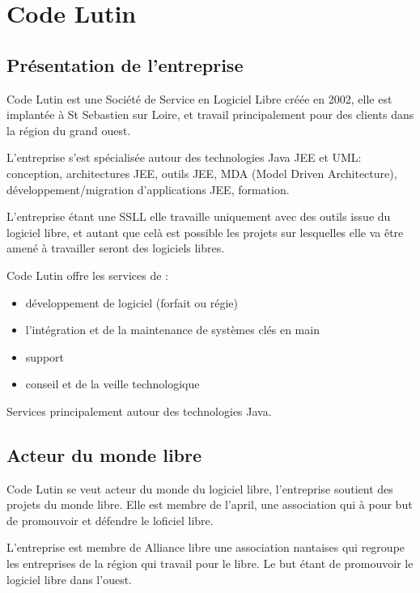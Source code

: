 \section{Code Lutin}

\subsection{Présentation de l'entreprise}


Code Lutin est une Société de Service en Logiciel Libre créée en 2002, elle est
implantée à St Sebastien sur Loire, et travail principalement pour des clients
dans la région du grand ouest.

L'entreprise s'est spécialisée autour des technologies Java JEE et UML:
conception, architectures JEE, outils JEE, MDA (Model Driven Architecture), 
développement/migration d’applications JEE, formation.

L'entreprise étant une SSLL elle travaille uniquement avec des outils issue du
logiciel libre, et autant que celà est possible les projets sur lesquelles elle
va être amené à travailler seront des logiciels libres.

Code Lutin offre les services de : 
\begin{itemize}
\item développement de logiciel (forfait ou régie)
\item l’intégration et de la maintenance de systèmes clés en main
\item support
\item conseil et de la veille technologique
\end{itemize}

Services principalement autour des technologies Java.


\subsection{Acteur du monde libre}

Code Lutin se veut acteur du monde du logiciel libre, l'entreprise soutient des
projets du monde libre. Elle est membre de l'april, une association qui à pour
but de promouvoir et défendre le loficiel libre.

L'entreprise est membre de Alliance libre une association nantaises qui regroupe
les entreprises de la région qui travail pour le libre. Le but étant de
promouvoir le logiciel libre dans l'ouest.

